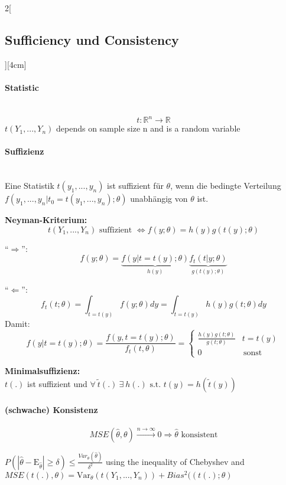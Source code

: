 \documentclass[8pt]{extarticle}
\begin{document}
\begin{multicols}{2}[\subsection{Sufficiency und Consistency}][4cm]

\paragraph{Statistic} \ \\
$$t: \mathbb{R}^n \rightarrow \mathbb{R}$$
$t(Y_1, ..., Y_n)$ depends on sample size n and is a random variable

\paragraph{Suffizienz} \ \\
\noindent Eine Statistik $t(y_1,...,y_n)$ ist suffizient für $\theta$, wenn die bedingte Verteilung $f(y_1,...,y_n|t_0 = t(y_1,...,y_n);\theta)$ unabhängig von $\theta$ ist. \vspace{0.5em}

\textbf{Neyman-Kriterium:}
$$t(Y_1,...,Y_n) \text{ suffizient } \Leftrightarrow f(y;\theta) = h(y)g\left(t(y);\theta\right)$$
\begin{Proof}
``$\Rightarrow$'':
$$f(y;\theta) = \underbrace{f(y|t = t(y);\theta)}_{h(y)} \underbrace{f_t(t|y;\theta)}_{g(t(y);\theta)}$$

\noindent ``$\Leftarrow$'':
$$f_t(t;\theta) = \int_{t=t(y)} f(y;\theta)dy = \int_{t=t(y)} h(y) g(t;\theta)dy$$
\indent Damit:
$$f\left(y|t=t(y);\theta\right) = \frac{f(y,t=t(y);\theta)}{f_t(t,\theta)}
= \begin{cases}
\frac{h(y)g(t;\theta)}{g(t;\theta)} & t=t(y) \\
0 & \, \text{sonst}
\end{cases}$$
\end{Proof}

\textbf{Minimalsuffizienz:} \ \\
$t(.)$ ist suffizient und $\forall\: \tilde{t}(.)\: \exists\: h(.) \text{ s.t. } t(y) = h(\tilde{t}(y))$

\paragraph{(schwache) Konsistenz}
$$MSE(\hat{\theta},\theta) \overset{n\rightarrow\infty}{\longrightarrow} 0 \Rightarrow \hat{\theta} \text{ konsistent}$$

\begin{Proof}
$P(|\hat{\theta} - \mathrm{E}_{\hat{\theta}}| \geq \delta) \leq \frac{Var_\theta(\hat{\theta})}{\delta^2}$ using the inequality of Chebyshev
and $MSE(t(.), \theta) = \mathrm{Var}_\theta\left(t(Y_1,...,Y_n)\right) + Bias^2((t(.); \theta)$
\end{Proof}

\end{multicols}
\end{document}

